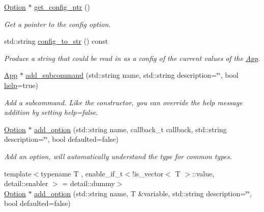 \begin{DoxyCompactItemize}
\mbox{\label{class_c_l_i_1_1_app_aa516fbfd33a220af66deccd8e6a465a0}} 
\hyperlink{class_c_l_i_1_1_option}{Option} $\ast$ \hyperlink{class_c_l_i_1_1_app_aa516fbfd33a220af66deccd8e6a465a0}{get\+\_\+config\+\_\+ptr} ()
\begin{DoxyCompactList}\small\item\em Get a pointer to the config option. \end{DoxyCompactList}\item 
\mbox{\label{class_c_l_i_1_1_app_a0ae617260d1ffbd5d588bc6603dcfba4}} 
std\+::string \hyperlink{class_c_l_i_1_1_app_a0ae617260d1ffbd5d588bc6603dcfba4}{config\+\_\+to\+\_\+str} () const
\begin{DoxyCompactList}\small\item\em Produce a string that could be read in as a config of the current values of the \hyperlink{class_c_l_i_1_1_app}{App}. \end{DoxyCompactList}\item 
\mbox{\label{class_c_l_i_1_1_app_a4c329987155640f837e655b886d3ce80}} 
\hyperlink{class_c_l_i_1_1_app}{App} $\ast$ \hyperlink{class_c_l_i_1_1_app_a4c329987155640f837e655b886d3ce80}{add\+\_\+subcommand} (std\+::string name, std\+::string description=\char`\"{}\char`\"{}, bool \hyperlink{class_c_l_i_1_1_app_ab85cc077e2dfee3bd94eed8c61e1e2ea}{help}=true)
\begin{DoxyCompactList}\small\item\em Add a subcommand. Like the constructor, you can override the help message addition by setting help=false. \end{DoxyCompactList}\item 
\hyperlink{class_c_l_i_1_1_option}{Option} $\ast$ \hyperlink{class_c_l_i_1_1_app_a6e8e118fcc2a06f9d21c6b3d84bb0af4}{add\+\_\+option} (std\+::string name, callback\+\_\+t callback, std\+::string description=\char`\"{}\char`\"{}, bool defaulted=false)
\begin{DoxyCompactList}\small\item\em Add an option, will automatically understand the type for common types. \end{DoxyCompactList}\item 
{\footnotesize template$<$typename T , enable\+\_\+if\+\_\+t$<$!is\+\_\+vector$<$ T $>$\+::value, detail\+::enabler $>$  = detail\+::dummy$>$ }\\\hyperlink{class_c_l_i_1_1_option}{Option} $\ast$ \hyperlink{class_c_l_i_1_1_app_a5ba8a993d48f76f98674193e77835bc6}{add\+\_\+option} (std\+::string name, T \&variable, std\+::string description=\char`\"{}\char`\"{}, bool defaulted=false)

\end{DoxyCompactItemize}
